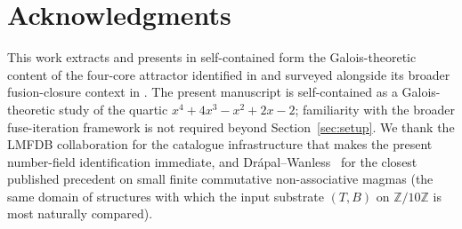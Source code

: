 \documentclass[11pt,reqno]{amsart}
\theoremstyle{plain}
\theoremstyle{definition}
\theoremstyle{remark}
\newcommand{\Z}{\mathbb{Z}}
\newcommand{\TS}{T}
\newcommand{\BH}{B}
\begin{document}
\section*{Acknowledgments}

This work extracts and presents in self-contained form the
Galois-theoretic content of the four-core attractor identified in
\cite{SandersGishFourCore} and surveyed alongside its broader
fusion-closure context in \cite{SandersGishFourCoreJalg}. The present
manuscript is self-contained as a Galois-theoretic study of the quartic
$x^{4} + 4x^{3} - x^{2} + 2x - 2$; familiarity with the broader
fuse-iteration framework is not required beyond
Section~\ref{sec:setup}. We thank the LMFDB collaboration for the
catalogue infrastructure that makes the present number-field
identification immediate, and Dr\'apal--Wanless~\cite{DrapalWanless2021}
for the closest published precedent on small finite commutative
non-associative magmas (the same domain of structures with which the
input substrate $(\TS, \BH)$ on $\Z/10\Z$ is most naturally compared).
\end{document}
